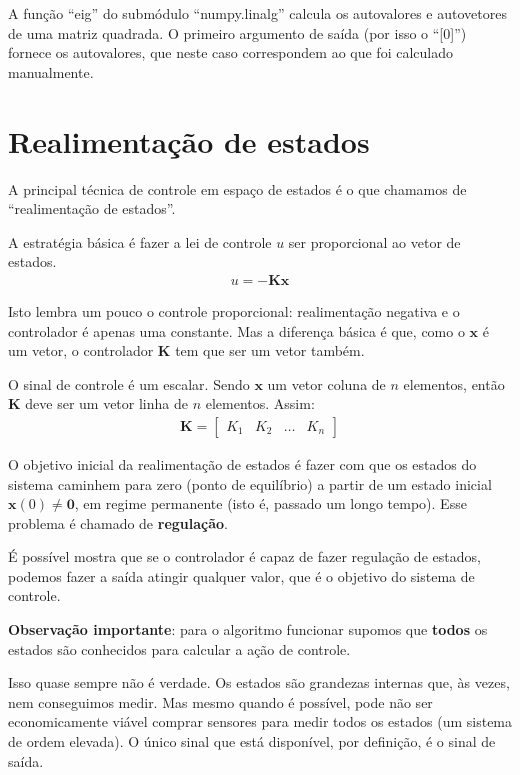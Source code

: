 \documentclass[
]{book}
\begin{document}
A função ``eig'' do submódulo ``numpy.linalg'' calcula os autovalores e autovetores de uma matriz quadrada. O primeiro argumento de saída (por isso o ``{[}0{]}'') fornece os autovalores, que neste caso correspondem ao que foi calculado manualmente.

\hypertarget{realimentauxe7uxe3o-de-estados}{%
\chapter{Realimentação de estados}\label{realimentauxe7uxe3o-de-estados}}

A principal técnica de controle em espaço de estados é o que chamamos de
``realimentação de estados''.

A estratégia básica é fazer a lei de controle \(u\) ser proporcional ao
vetor de estados.
\begin{align*}
    u = -\mathbf{Kx}
\end{align*}

Isto lembra um pouco o controle proporcional: realimentação negativa
e o controlador é apenas uma constante. Mas a diferença básica é que,
como o \(\mathbf{x}\) é um vetor, o controlador \(\mathbf{K}\) tem que ser
um vetor também.

O sinal de controle é um escalar. Sendo \(\mathbf{x}\) um vetor coluna de
\(n\) elementos, então \(\mathbf{K}\) deve ser um vetor linha de \(n\)
elementos. Assim:
\begin{align*}
    \mathbf{K}= \left[\begin{array}{cccc}K_1 & K_2 & \ldots & K_n\end{array}\right]
\end{align*}

O objetivo inicial da realimentação de estados é fazer com que os
estados do sistema caminhem para zero (ponto de equilíbrio) a partir de
um estado inicial \(\mathbf{x}(0)\neq \mathbf{0}\), em regime permanente
(isto é, passado um longo tempo). Esse problema é chamado de
\textbf{regulação}.

É possível mostra que se o controlador é capaz de fazer regulação de
estados, podemos fazer a saída atingir qualquer valor, que é o objetivo
do sistema de controle.

\textbf{Observação importante}: para o algoritmo funcionar supomos que
\textbf{todos} os estados são conhecidos para calcular a ação de controle.

Isso quase sempre não é verdade. Os estados são grandezas internas que,
às vezes, nem conseguimos medir. Mas mesmo quando é possível, pode não
ser economicamente viável comprar sensores para medir todos os estados (um sistema de ordem elevada). O único sinal que está disponível, por definição, é o sinal de saída.
\end{document}
